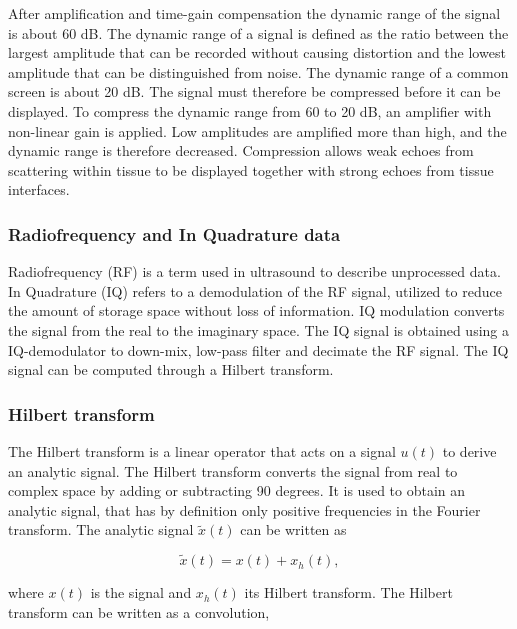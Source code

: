 After amplification and time-gain compensation the dynamic range of the signal is about 60 dB. The dynamic range of a signal is defined as the ratio between the largest amplitude that can be recorded without causing distortion and the lowest amplitude that can be distinguished from noise. The dynamic range of a common screen is about 20 dB. The signal must therefore be compressed before it can be displayed. To compress the dynamic range from 60 to 20 dB, an amplifier with non-linear gain is applied. Low amplitudes are amplified more than high, and the dynamic range is therefore decreased. Compression allows weak echoes from scattering within tissue to be displayed together with strong echoes from tissue interfaces.

\subsubsection{Radiofrequency and In Quadrature data}
Radiofrequency (RF) is a term used in ultrasound to describe unprocessed data. In Quadrature (IQ) refers to a demodulation of the RF signal, utilized to reduce the amount of storage space without loss of information. IQ modulation converts the signal from the real to the imaginary space. The IQ signal is obtained using a IQ-demodulator to down-mix, low-pass filter and decimate the RF signal. The IQ signal can be computed through a Hilbert transform\cite{Kirkhorn1999}.

\subsubsection{Hilbert transform}
The Hilbert transform is a linear operator that acts on a signal $u(t)$ to derive an analytic signal. The Hilbert transform converts the signal from real to complex space by adding or subtracting 90 degrees. It is used to obtain an analytic signal, that has by definition only positive frequencies in the Fourier transform. The analytic signal $\tilde{x}(t)$ can be written as

\begin{equation}
\tilde{x}(t) = x(t) + x_h(t),
\end{equation}

where $x(t)$ is the signal and $x_h(t)$ its Hilbert transform. The Hilbert transform can be written as a convolution, 


